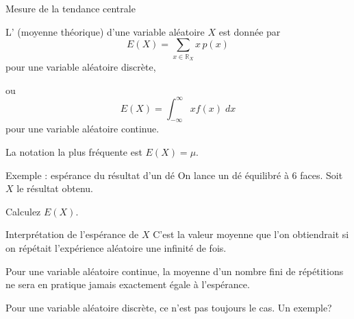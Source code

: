 \documentclass{BeamerTemplate}
\newcommand{\cibleReponse}{}
\newcommand{\lienreponse}[1]{\gdef\cibleReponse{#1}}
\begin{document}
\begin{frame}[t]{Mesure de la tendance centrale}
\begin{defn}{}
 L' (moyenne théorique) d'une variable aléatoire $X$ est donnée par
 $$E(X)=\sum_{x\in \mathbb{R}_X} x\, p(x)$$
 pour une variable aléatoire discrète,

 ou
 $$E(X)=\int_{-\infty}^\infty x f(x)\;dx$$
 pour une variable aléatoire continue.
\end{defn}
La notation la plus fréquente est $E(X)=\mu$.
\end{frame}

\begin{frame}[t,label=exde]{Exemple : espérance du résultat d'un dé}
On lance un dé équilibré à 6 faces. Soit $X$ le résultat obtenu.

\medskip
Calculez $E(X)$.
\lienreponse{rep-ex2}
\end{frame}

\begin{frame}[t]{Interprétation de l'espérance de $X$}
    C'est la valeur moyenne que l'on obtiendrait si on répétait l'expérience aléatoire une infinité de fois.

\vspace{1cm}

    Pour une variable aléatoire continue, la moyenne d'un nombre fini de répétitions ne sera en pratique jamais exactement égale à l'espérance.

\vspace{1cm}

    Pour une variable aléatoire discrète, ce n'est pas toujours le cas. Un exemple?
\end{frame}
\end{document}
